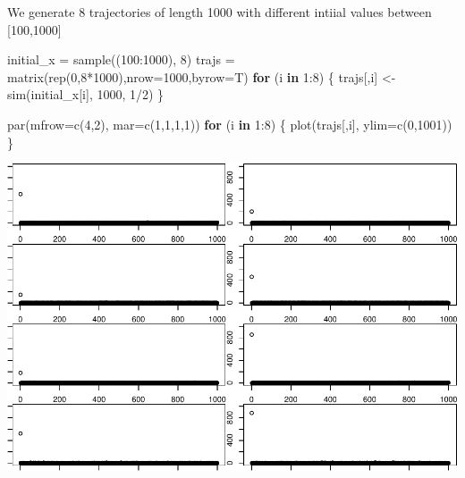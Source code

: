 \documentclass[
]{article}
\newenvironment{Shaded}{\begin{snugshade}}{\end{snugshade}}
\newcommand{\AttributeTok}[1]{\textcolor[rgb]{0.77,0.63,0.00}{#1}}
\newcommand{\ControlFlowTok}[1]{\textcolor[rgb]{0.13,0.29,0.53}{\textbf{#1}}}
\newcommand{\DecValTok}[1]{\textcolor[rgb]{0.00,0.00,0.81}{#1}}
\newcommand{\FunctionTok}[1]{\textcolor[rgb]{0.00,0.00,0.00}{#1}}
\newcommand{\NormalTok}[1]{#1}
\newcommand{\OtherTok}[1]{\textcolor[rgb]{0.56,0.35,0.01}{#1}}
\newcommand{\SpecialCharTok}[1]{\textcolor[rgb]{0.00,0.00,0.00}{#1}}
\begin{document}
We generate 8 trajectories of length 1000 with different intiial values
between {[}100,1000{]}

\begin{Shaded}
\begin{Highlighting}[]
\NormalTok{initial\_x }\OtherTok{=} \FunctionTok{sample}\NormalTok{((}\DecValTok{100}\SpecialCharTok{:}\DecValTok{1000}\NormalTok{), }\DecValTok{8}\NormalTok{)}
\NormalTok{trajs }\OtherTok{=} \FunctionTok{matrix}\NormalTok{(}\FunctionTok{rep}\NormalTok{(}\DecValTok{0}\NormalTok{,}\DecValTok{8}\SpecialCharTok{*}\DecValTok{1000}\NormalTok{),}\AttributeTok{nrow=}\DecValTok{1000}\NormalTok{,}\AttributeTok{byrow=}\NormalTok{T)}
\ControlFlowTok{for}\NormalTok{ (i }\ControlFlowTok{in} \DecValTok{1}\SpecialCharTok{:}\DecValTok{8}\NormalTok{) \{}
\NormalTok{    trajs[,i] }\OtherTok{\textless{}{-}} \FunctionTok{sim}\NormalTok{(initial\_x[i], }\DecValTok{1000}\NormalTok{, }\DecValTok{1}\SpecialCharTok{/}\DecValTok{2}\NormalTok{)}
\NormalTok{\}}
\end{Highlighting}
\end{Shaded}

\begin{Shaded}
\begin{Highlighting}[]
\FunctionTok{par}\NormalTok{(}\AttributeTok{mfrow=}\FunctionTok{c}\NormalTok{(}\DecValTok{4}\NormalTok{,}\DecValTok{2}\NormalTok{), }\AttributeTok{mar=}\FunctionTok{c}\NormalTok{(}\DecValTok{1}\NormalTok{,}\DecValTok{1}\NormalTok{,}\DecValTok{1}\NormalTok{,}\DecValTok{1}\NormalTok{))}
\ControlFlowTok{for}\NormalTok{ (i }\ControlFlowTok{in} \DecValTok{1}\SpecialCharTok{:}\DecValTok{8}\NormalTok{) \{}
    \FunctionTok{plot}\NormalTok{(trajs[,i], }\AttributeTok{ylim=}\FunctionTok{c}\NormalTok{(}\DecValTok{0}\NormalTok{,}\DecValTok{1001}\NormalTok{))}
\NormalTok{\}}
\end{Highlighting}
\end{Shaded}

\includegraphics{./figures/unnamed-chunk-15-1.pdf}
\end{document}
